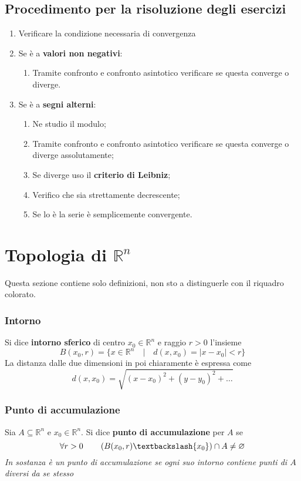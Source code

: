 \documentclass[x11names]{article}
\begin{document}
		
	\begin{es}{}
		\subsection{Procedimento per la risoluzione degli esercizi}
		\begin{enumerate}
			\item Verificare la condizione necessaria di convergenza
			\item Se è a \textbf{valori non negativi}: 
				\begin{enumerate}
					\item Tramite confronto e confronto asintotico verificare se questa converge o diverge.
				\end{enumerate}
			\item Se è a \textbf{segni alterni}:
				\begin{enumerate}
					\item Ne studio il modulo;
					\item Tramite confronto e confronto asintotico verificare se questa converge o diverge assolutamente;
					\item Se diverge uso il \textbf{criterio di Leibniz};
					\item Verifico che sia strettamente decrescente;
					\item Se lo è la serie è semplicemente convergente.
				\end{enumerate}
		\end{enumerate}
	\end{es}
	
\newpage
\section{Topologia di \(\mathbb{R}^n\)}
Questa sezione contiene solo definizioni, non sto a distinguerle con il riquadro colorato.

\subsubsection*{Intorno}
Si dice \textbf{intorno sferico} di centro \(x_{0} \in \mathbb{R}^n\) e raggio \(r>0\) l'insieme
\[ 
B(x_{0},r) = \{x \in \mathbb{R}^n \quad |\quad d(x,x_{0}) = |x-x_{0}| < r\}
\]
La distanza dalle due dimensioni in poi chiaramente è espressa come
\[ 
d(x,x_{0}) = \sqrt{(x-x_{0})^2 + (y-y_{0})^2 + \dots }
\]


\subsubsection*{Punto di accumulazione}
Sia \(A \subseteq \mathbb{R}^n\) e \(x_{0} \in \mathbb{R}^n\). Si dice \textbf{punto di accumulazione} per \(A\) se
\[ 
\forall r > 0 \qquad \left(B(x_{0},r) \textbackslash \{x_{0}\} \right) \cap A \neq \varnothing
\]
\textit{In sostanza è un punto di accumulazione se ogni suo intorno contiene punti di \(A\) diversi da se stesso}
\end{document}
